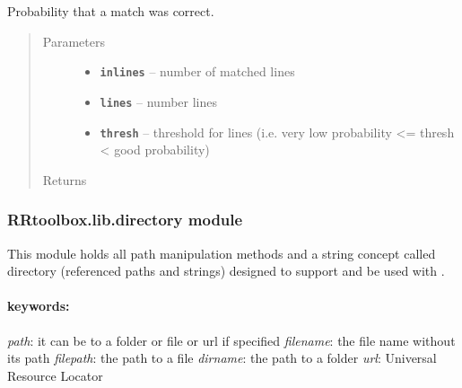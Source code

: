 \documentclass[letterpaper,10pt,english]{sphinxmanual}
\begin{document}

\begin{fulllineitems}
\label{RRtoolbox.lib:RRtoolbox.lib.descriptors.inlineRatio}
Probability that a match was correct.
\begin{quote}\begin{description}
\item[{Parameters}] \leavevmode\begin{itemize}
\item {} 
\textbf{\texttt{inlines}} -- number of matched lines

\item {} 
\textbf{\texttt{lines}} -- number lines

\item {} 
\textbf{\texttt{thresh}} -- threshold for lines (i.e. very low probability \textless{}= thresh \textless{} good probability)

\end{itemize}

\item[{Returns}] \leavevmode


\end{description}\end{quote}

\end{fulllineitems}



\subsubsection{RRtoolbox.lib.directory module}
\label{RRtoolbox.lib:module-RRtoolbox.lib.directory}\label{RRtoolbox.lib:rrtoolbox-lib-directory-module}
This module holds all path manipulation methods and a string concept called directory (referenced paths and strings)
designed to support  and be used with .


\paragraph{keywords:}
\label{RRtoolbox.lib:keywords}
\emph{path}: it can be to a folder or file or url if specified
\emph{filename}: the file name without its path
\emph{filepath}: the path to a file
\emph{dirname}: the path to a folder
\emph{url}: Universal Resource Locator
\end{document}
